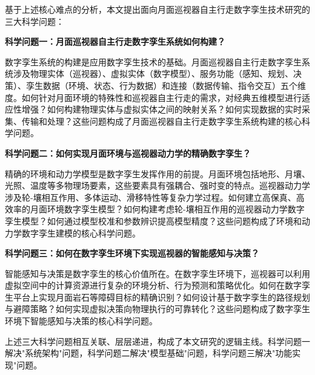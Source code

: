 基于上述核心难点的分析，本文提出面向月面巡视器自主行走数字孪生技术研究的三大科学问题：

\textbf{科学问题一：月面巡视器自主行走数字孪生系统如何构建？}

数字孪生系统的构建是应用数字孪生技术的基础。月面巡视器自主行走数字孪生系统涉及物理实体（巡视器）、虚拟实体（数字模型）、服务功能（感知、规划、决策）、孪生数据（环境、状态、行为数据）和连接（数据传输、指令交互）五个维度。如何针对月面环境的特殊性和巡视器自主行走的需求，对经典五维模型进行适应性增强？如何构建物理实体与虚拟实体之间的映射关系？如何实现数据的实时采集、传输和处理？这些问题构成了月面巡视器自主行走数字孪生系统构建的核心科学问题。

\textbf{科学问题二：如何实现月面环境与巡视器动力学的精确数字孪生？}

精确的环境和动力学模型是数字孪生发挥作用的前提。月面环境包括地形、月壤、光照、温度等多物理场要素，这些要素具有强耦合、强时变的特点。巡视器动力学涉及轮-壤相互作用、多体运动、滑移特性等复杂力学过程。如何建立高保真、高效率的月面环境数字孪生模型？如何构建考虑轮-壤相互作用的巡视器动力学数字孪生模型？如何通过模型校准和参数辨识提高模型精度？这些问题构成了环境和动力学数字孪生建模的核心科学问题。

\textbf{科学问题三：如何在数字孪生环境下实现巡视器的智能感知与决策？}

智能感知与决策是数字孪生的核心价值所在。在数字孪生环境下，巡视器可以利用虚拟空间中的计算资源进行复杂的环境分析、行为预测和策略优化。如何在数字孪生平台上实现月面岩石等障碍目标的精确识别？如何设计基于数字孪生的路径规划与避障策略？如何实现虚拟决策向物理执行的可靠转化？这些问题构成了数字孪生环境下智能感知与决策的核心科学问题。

上述三大科学问题相互关联、层层递进，构成了本文研究的逻辑主线。科学问题一解决"系统架构"问题，科学问题二解决"模型基础"问题，科学问题三解决"功能实现"问题。
